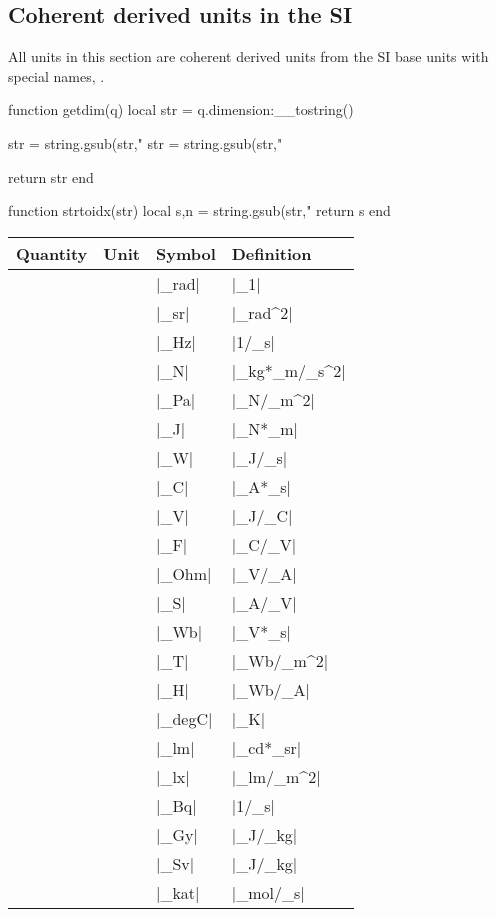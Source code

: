 \documentclass{ltxdoc}
\newcommand\thead[1]{#1}
\begin{document}
\newpage
\subsection{Coherent derived units in the SI}
\label{ch:coherent derived units}

All units in this section are coherent derived units from the SI base units with special names, \cite[118]{bipm06}.

\begin{luacode}
function getdim(q)
  local str = q.dimension:__tostring()

  str = string.gsub(str,"%
  str = string.gsub(str,"%

  return str
end

function strtoidx(str)
  local s,n = string.gsub(str,"%
  return s
end
\end{luacode}

\newcommand{\unittable}[1]{
  \begin{table}[H]
  \centering
  \begin{tabularx}{\linewidth}{%
    >{\setlength\hsize{1\hsize}}X%
    l%
    l%
    >{\setlength\hsize{1\hsize}}X%
  }
  \thead{Quantity} & \thead{Unit} & \thead{Symbol} & \thead{Definition} \\\hline

  #1

  \hline
  \end{tabularx}
  \end{table}
}

\newcommand{\printunit}[3][]{
  \ifthenelse{\equal{#1}{}}{
    \directlua{tex.print(getdim(#2))}
  }{
    #1
  } &
  \directlua{tex.print(#2.unit.name)} &
  |#2| &
  \mbox{|#3|}\index[unit]{\directlua{tex.print(#2.unit.name)} \texttt{\directlua{tex.print( strtoidx("#2") )}}} \\
}

\unittable{
  \printunit[Plane Angle\protect\footnotemark]{_rad}{_1}
  \printunit[Solid Angle\protect\footnotemark]{_sr}{_rad^2}
  \printunit{_Hz}{1/_s}
  \printunit{_N}{_kg*_m/_s^2}
  \printunit{_Pa}{_N/_m^2}
  \printunit[Energy]{_J}{_N*_m}
  \printunit{_W}{_J/_s}
  \printunit{_C}{_A*_s}
  \printunit{_V}{_J/_C}
  \printunit{_F}{_C/_V}
  \printunit{_Ohm}{_V/_A}
  \printunit[Electric Conductance\protect\footnotemark]{_S}{_A/_V}
  \printunit{_Wb}{_V*_s}
  \printunit{_T}{_Wb/_m^2}
  \printunit{_H}{_Wb/_A}
  \printunit[Temperature\protect\footnotemark]{_degC}{_K}
  \printunit[Luminous Flux]{_lm}{_cd*_sr}
  \printunit{_lx}{_lm/_m^2}
  \printunit[Activity]{_Bq}{1/_s}
  \printunit{_Gy}{_J/_kg}
  \printunit[Dose Equivalent]{_Sv}{_J/_kg}
  \printunit{_kat}{_mol/_s}
}
\end{document}
